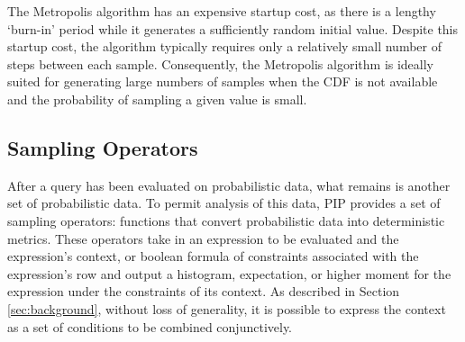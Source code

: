 The Metropolis algorithm has an  expensive startup cost, as there is a
lengthy  `burn-in' period  while  it generates  a sufficiently  random
initial  value.  Despite  this startup  cost, the  algorithm typically
requires only a relatively small  number of steps between each sample.
Consequently,   the  Metropolis  algorithm   is  ideally   suited  for
generating large numbers of samples  when the CDF is not available and
the probability of sampling a given value is small.

%
%
%


\subsection{Sampling Operators}
After a query has been evaluated on probabilistic data, what remains is another set of probabilistic data.  To permit analysis of this data, PIP provides a set of sampling operators: functions that convert probabilistic data into deterministic metrics.  These operators take in an expression to be evaluated and the expression's context, or boolean formula of constraints associated with the expression's row and output a histogram, expectation, or higher moment for the expression under the constraints of its context.  As described in Section \ref{sec:background}, without loss of generality, it is possible to express the context as a set of conditions to be combined conjunctively.  

